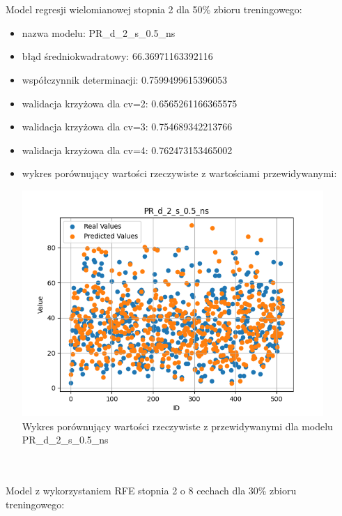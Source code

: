 \documentclass[11pt, a4paper, notitlepage]{report}
\begin{document}
\\ \\
Model regresji wielomianowej stopnia 2 dla 50\% zbioru treningowego:
\begin{itemize}
	\item nazwa modelu: PR\_d\_2\_s\_0.5\_ns
	\item błąd średniokwadratowy: 66.36971163392116
	\item współczynnik determinacji: 0.7599499615396053
	\item walidacja krzyżowa dla cv=2: 0.6565261166365575
	\item walidacja krzyżowa dla cv=3: 0.754689342213766
	\item walidacja krzyżowa dla cv=4: 0.762473153465002
	\item wykres porównujący wartości rzeczywiste z wartościami przewidywanymi: \begin{center} \small
		\includegraphics[width=0.9\textwidth]{graphics/plots/PR_d_2_s_0.5_ns.png} \\
		\caption{Wykres porównujący wartości rzeczywiste z przewidywanymi dla modelu PR\_d\_2\_s\_0.5\_ns}
	\end{center}
\end{itemize}
\\ \\
Model z wykorzystaniem RFE stopnia 2 o 8 cechach dla 30\% zbioru treningowego:
\end{document}
